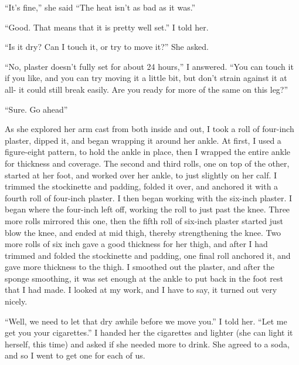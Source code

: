 ``It's fine,'' she said ``The heat isn't as bad as it was.''

``Good. That means that it is pretty well set.'' I told her.

``Is it dry? Can I touch it, or try to move it?'' She asked.

``No, plaster doesn't fully set for about 24 hours,'' I answered. ``You can touch it if you
like, and you can try moving it a little bit, but don't strain against it at all- it could still
break easily. Are you ready for more of the same on this leg?''

``Sure. Go ahead''

As she explored her arm cast from both inside and out, I took a roll of four-inch plaster,
dipped it, and began wrapping it around her ankle. At first, I used a figure-eight pattern, to
hold the ankle in place, then I wrapped the entire ankle for thickness and coverage. The second
and third rolls, one on top of the other, started at her foot, and worked over her ankle, to
just slightly on her calf. I trimmed the stockinette and padding, folded it over, and anchored
it with a fourth roll of four-inch plaster. I then began working with the six-inch plaster. I
began where the four-inch left off, working the roll to just past the knee. Three more rolls
mirrored this one, then the fifth roll of six-inch plaster started just blow the knee, and ended
at mid thigh, thereby strengthening the knee. Two more rolls of six inch gave a good thickness
for her thigh, and after I had trimmed and folded the stockinette and padding, one final roll
anchored it, and gave more thickness to the thigh. I smoothed out the plaster, and after the
sponge smoothing, it was set enough at the ankle to put back in the foot rest that I had made. I
looked at my work, and I have to say, it turned out very nicely.

``Well, we need to let that dry awhile before we move you.'' I told her. ``Let me get you
your cigarettes.'' I handed her the cigarettes and lighter (she can light it herself, this time)
and asked if she needed more to drink. She agreed to a soda, and so I went to get one for each
of us.

